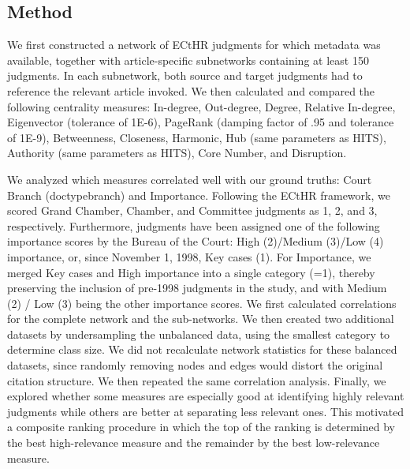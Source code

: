 \documentclass[sigconf]{acmart}
\begin{document}
\subsection{Method}

We first constructed a network of ECtHR judgments for which metadata was available, together with article-specific subnetworks containing at least 150 judgments. In each subnetwork, both source and target judgments had to reference the relevant article invoked.
We then calculated and compared the following centrality measures: In-degree, Out-degree, Degree, Relative In-degree, Eigenvector (tolerance of 1E-6), PageRank (damping factor of .95 and tolerance of 1E-9), Betweenness, Closeness, Harmonic, Hub (same parameters as HITS), Authority (same parameters as HITS), Core Number, and Disruption.


We analyzed which measures correlated well with our ground truths: Court Branch (doctypebranch) and Importance. Following the ECtHR framework, we scored Grand Chamber, Chamber, and Committee judgments as 1, 2, and 3, respectively. Furthermore, judgments have been assigned one of the following importance scores by the Bureau of the Court: High (2)/Medium (3)/Low (4) importance, or, since November 1, 1998, Key cases (1). For Importance, we merged Key cases and High importance into a single category (=1), thereby preserving the inclusion of pre-1998 judgments in the study, and with Medium (2) / Low (3) being the other importance scores.
We first calculated correlations for the complete network and the sub-networks. We then created two additional datasets by undersampling the unbalanced data, using the smallest category to determine class size. We did not recalculate network statistics for these balanced datasets, since randomly removing nodes and edges would distort the original citation structure. We then repeated the same correlation analysis.
Finally, we explored whether some measures are especially good at identifying highly relevant judgments while others are better at separating less relevant ones. This motivated a composite ranking procedure in which the top of the ranking is determined by the best high-relevance measure and the remainder by the best low-relevance measure.
\end{document}
